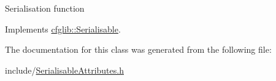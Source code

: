 Serialisation function 

Implements \hyperlink{classcfglib_1_1Serialisable_aaeb80cc7397ad312e5ae34f39412ce42}{cfglib\+::\+Serialisable}.



The documentation for this class was generated from the following file\+:\begin{DoxyCompactItemize}
\item 
include/\hyperlink{SerialisableAttributes_8h}{Serialisable\+Attributes.\+h}\end{DoxyCompactItemize}
